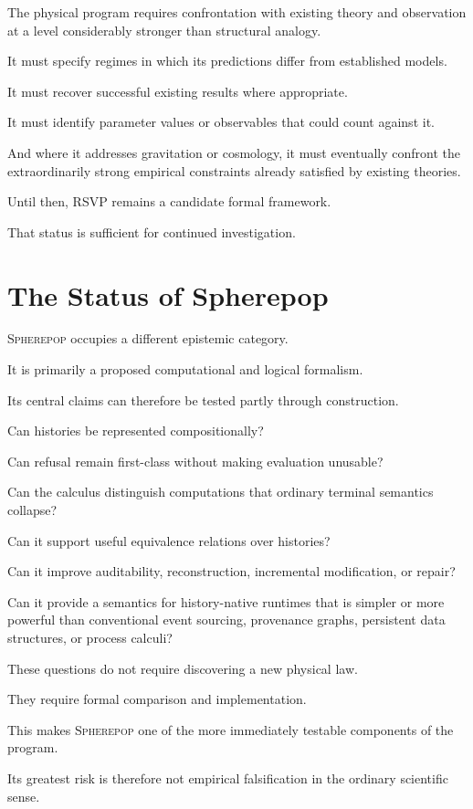 \documentclass[11pt]{article}
\theoremstyle{remark}
\newcommand{\RSVP}{\textsc{RSVP}}
\newcommand{\Spherepop}{\textsc{Spherepop}}
\begin{document}
The physical program requires confrontation with existing theory and
observation at a level considerably stronger than structural analogy.

It must specify regimes in which its predictions differ from established
models.

It must recover successful existing results where appropriate.

It must identify parameter values or observables that could count against it.

And where it addresses gravitation or cosmology, it must eventually confront
the extraordinarily strong empirical constraints already satisfied by existing
theories.

Until then, \RSVP{} remains a candidate formal framework.

That status is sufficient for continued investigation.

\section{The Status of Spherepop}

\Spherepop{} occupies a different epistemic category.

It is primarily a proposed computational and logical formalism.

Its central claims can therefore be tested partly through construction.

Can histories be represented compositionally?

Can refusal remain first-class without making evaluation unusable?

Can the calculus distinguish computations that ordinary terminal semantics
collapse?

Can it support useful equivalence relations over histories?

Can it improve auditability, reconstruction, incremental modification, or
repair?

Can it provide a semantics for history-native runtimes that is simpler or more
powerful than conventional event sourcing, provenance graphs, persistent data
structures, or process calculi?

These questions do not require discovering a new physical law.

They require formal comparison and implementation.

This makes \Spherepop{} one of the more immediately testable components of the
program.

Its greatest risk is therefore not empirical falsification in the ordinary
scientific sense.
\end{document}
